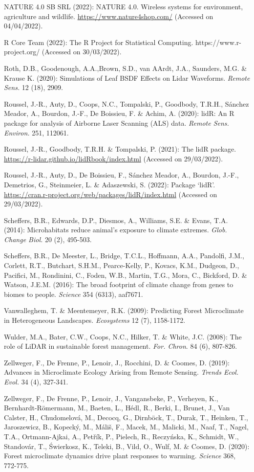 \documentclass[5p]{elsarticle} %
\newlength{\cslhangindent}
\newlength{\cslentryspacingunit} %
\newenvironment{CSLReferences}[2] %
 {%
  \setlength{\parindent}{0pt}
  \ifodd #1
  \let\oldpar\par
  \def\par{\hangindent=\cslhangindent\oldpar}
  \fi
  \setlength{\parskip}{#2\cslentryspacingunit}
 }%
 {}
\begin{document}
\begin{CSLReferences}{1}{0}
NATURE 4.0 SB SRL (2022): NATURE 4.0. Wireless systems for environment, agriculture and wildlife. \url{https://www.nature4shop.com/} (Accessed on 04/04/2022).

R Core Team (2022): The R Project for Statistical Computing. https://www.r-project.org/ (Accessed on 30/03/2022). 

Roth, D.B., Goodenough, A.A.,Brown, S.D., van AArdt, J.A., Saunders, M.G. \& Krause K. (2020): Simulations of Leaf BSDF Effects on Lidar Waveforms. \emph{Remote Sens.} 12 (18), 2909.

Roussel, J.-R., Auty, D., Coops, N.C., Tompalski, P., Goodbody, T.R.H., Sánchez Meador, A., Bourdon, J.-F., De Boissieu, F. \& Achim, A. (2020): lidR: An R package for analysis of Airborne Laser Scanning (ALS) data. \emph{Remote Sens. Environ.} 251, 112061.

Roussel, J.-R., Goodbody, T.R.H. \& Tompalski, P. (2021): The lidR package. \url{https://r-lidar.github.io/lidRbook/index.html} (Accessed on 29/03/2022).

Roussel, J.-R., Auty, D., De Boissieu, F., Sánchez Meador, A., Bourdon, J.-F., Demetrios, G., Steinmeier, L. \& Adaszewski, S. (2022): Package ‘lidR’. \url{https://cran.r-project.org/web/packages/lidR/index.html} (Accessed on 29/03/2022).

Scheffers, B.R., Edwards, D.P., Diesmos, A., Williams, S.E. \& Evans, T.A. (2014): Microhabitats reduce animal’s exposure to climate extremes. \emph{Glob. Change Biol.} 20 (2), 495-503.

Scheffers, B.R., De Meester, L., Bridge, T.C.L., Hoffmann, A.A., Pandolfi, J.M., Corlett, R.T., Butchart, S.H.M., Pearce-Kelly, P., Kovacs, K.M., Dudgeon, D., Pacifici, M., Rondinini, C., Foden, W.B., Martin, T.G., Mora, C., Bickford, D. \& Watson, J.E.M. (2016): The broad footprint of climate change from genes to biomes to people. \emph{Science} 354 (6313), aaf7671.

Vanwalleghem, T. \& Meentemeyer, R.K. (2009): Predicting Forest Microclimate in Heterogeneous Landscapes. \emph{Ecosystems} 12 (7), 1158-1172.

Wulder, M.A., Bater, C.W., Coops, N.C., Hilker, T. \& White, J.C. (2008): The role of LiDAR in sustainable forest management. \emph{For. Chron}. 84 (6), 807-826.

Zellweger, F., De Frenne, P., Lenoir, J., Rocchini, D. \& Coomes, D. (2019): Advances in Microclimate Ecology Arising from Remote Sensing. \emph{Trends Ecol. Evol.} 34 (4), 327-341.

Zellweger, F., De Frenne, P., Lenoir, J., Vangansbeke, P., Verheyen, K., Bernhardt-Römermann, M., Baeten, L., Hédl, R., Berki, I., Brunet, J., Van Calster, H., Chudomelová, M., Decocq, G., Dirnböck, T., Durak, T., Heinken, T., Jaroszewicz, B., Kopecký, M., Máliš, F., Macek, M., Malicki, M., Naaf, T., Nagel, T.A., Ortmann-Ajkai, A., Petřík, P., Pielech, R., Reczyńska, K., Schmidt, W., Standovár, T., Świerkosz, K., Teleki, B., Vild, O., Wulf, M. \& Coomes, D. (2020): Forest microclimate dynamics drive plant responses to warming. \emph{Science} 368, 772-775.


\end{CSLReferences}
\end{document}
